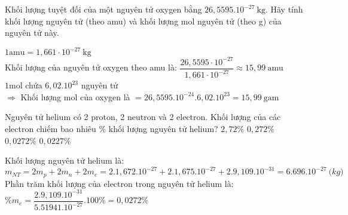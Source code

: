 \begin{vdex}[2]
	Khối lượng tuyệt đối của một nguyên tử oxygen bằng $26,5595.10^{-27} \mathrm{~kg}$. Hãy tính khối lượng nguyên tử (theo amu) và khối lượng mol nguyên tử (theo g) của nguyên tử này.
	\loigiai
	{%
		$
		1 \mathrm{amu}=1,661 \cdot 10^{-27} \mathrm{~kg}
		$\\
		
		
		Khối lượng của nguyên tử oxygen theo amu là:
		$
		\dfrac{26,5595 \cdot 10^{-27}}{1,661 \cdot 10^{-27}} \approx 15,99~ \mathrm{amu}
		$\\
		
		$1 \mathrm{mol}$ chứa $ 6,02.10^{23} $ nguyên tử\\
		$\Rightarrow$ Khối lượng mol của oxygen là  $=26,5595.10^{-24}.6,02.10^{23}= 15,99~ \mathrm{gam} $
		
	}
\end{vdex}


\begin{vdex}[2]
	Nguyên tử helium có 2 proton, 2 neutron và 2 electron. Khối lượng của các electron chiếm bao nhiêu $\%$ khối lượng nguyên tử helium?
	\choice
	{%
		$2,72 \%$
	}
	{%
		$0,272 \%$
	}
	{%
		\True	$0,0272 \%$
	}
	{%
		$0,0227 \%$
	}
	\huongdan
	{%
		Khối lượng nguyên tử helium là:\\ $ m_{NT} = 2m_{p} + 2m_{n} + 2m_{e} = 2.1,672.10^{-27} + 2.1,675.10^{-27} + 2 .9,109.10^{-31} = 6.696.10^{-27}~\mathrm (kg) $\\
		Phần trăm khối lượng của electron trong nguyên tử helium là:\\
		$ \%m_{e}=\dfrac{2 .9,109.10^{-31}}{5.51941.10^{-27}}.100\%=0,0272 \%$
		
	}
\end{vdex}



